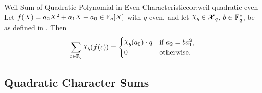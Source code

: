 \begin{corolary}{Weil Sum of Quadratic Polynomial in Even Characteristic}{cor:weil-quadratic-even}
  Let $f(X)=a_2X^2+a_1X+a_0\in\mathbb{F}_q[X]$ with $q$ even, and let $\chi_b\in\Xq$, $b\in\mathbb{F}_q^*$, be as defined in . Then
  $$\sum_{c\in\bbF_q}\chi_b(f(c))=\begin{cases}
    \chi_b(a_0)\cdot q & \text{if }a_2=ba_1^2,\\
    0 & \text{otherwise.}
  \end{cases}$$
\end{corolary}

\subsection{Quadratic Character Sums}
%

